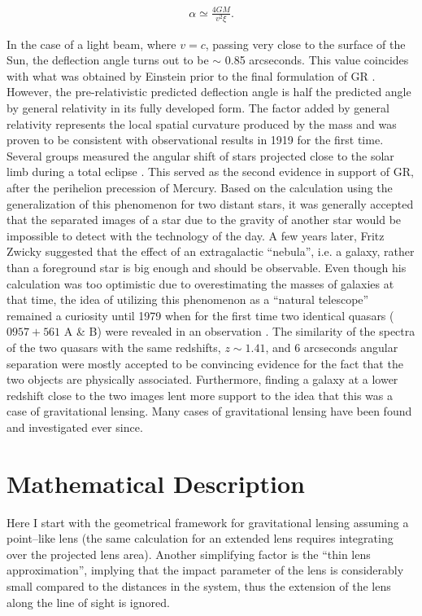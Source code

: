 \documentclass[a4wide,12pt]{book}
\begin{document}
{\begin{eqnarray}
\label{eq:alpha}
\alpha \simeq \frac{4GM}{v^2 \xi}.
\end{eqnarray}

In the case of a light beam, where $v = c$, passing very close to the surface of the Sun, the deflection angle turns out to be $\sim$ 0.85 arcseconds. This value coincides with what was obtained by Einstein prior to the final formulation of GR \citep[][in German!]{Einstein1911}. However, the pre-relativistic predicted deflection angle is half the predicted angle by general relativity in its fully developed form. The factor added by general relativity represents the local spatial curvature produced by the mass and was proven to be consistent with observational results in 1919 for the first time. Several groups measured the angular shift of stars projected close to the solar limb during a total eclipse \citet{Eddington+1919}. This served as the second evidence in support of GR, after the perihelion precession of Mercury. Based on the calculation using the generalization of this phenomenon for two distant stars, it was generally accepted that the separated images of a star due to the gravity of another star would be impossible to detect with the technology of the day. A few years later, Fritz Zwicky suggested  \citep{Zwicky1937} that the effect of an extragalactic ``nebula'', i.e. a galaxy, rather than a foreground star is big enough and should be observable. Even though his calculation was too optimistic due to overestimating the masses of galaxies at that time, the idea of utilizing this phenomenon as a ``natural telescope''  remained a curiosity until 1979 when for the first time two identical quasars ($0957+561$ A \& B) were revealed in an observation \citep{Walsh+1979}. The similarity of the spectra of the two quasars with the same redshifts, $z \sim 1.41$, and 6 arcseconds angular separation were mostly accepted to be convincing evidence for the fact that the two objects are physically associated. Furthermore, finding a galaxy at a lower redshift close to the two images lent more support to the idea that this was a case of gravitational lensing. Many cases of gravitational lensing have been found and investigated ever since.

\section{Mathematical Description}
Here I start with the geometrical framework for gravitational lensing assuming a point--like lens (the same calculation for an extended lens requires integrating over the projected lens area). Another simplifying factor is the ``thin lens approximation'', implying that the impact parameter of the lens is considerably small compared to the distances in the system, thus the extension of the lens along the line of sight is ignored.

}
\end{document}
